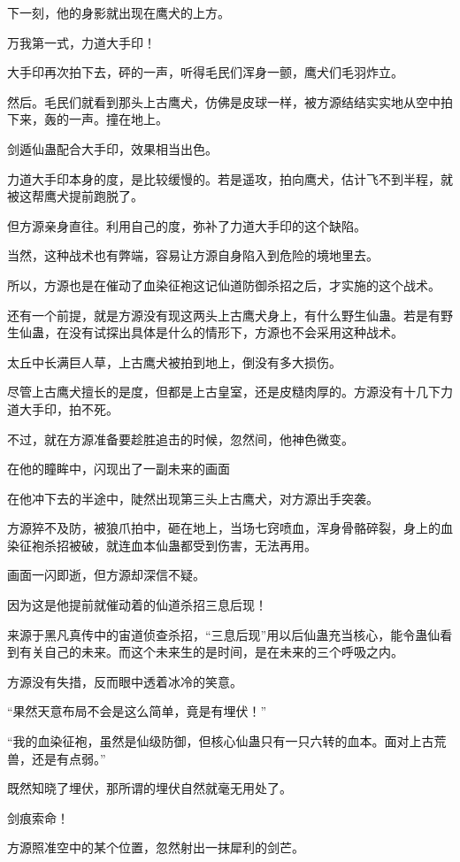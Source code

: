 \begin{this_body}
下一刻，他的身影就出现在鹰犬的上方。

万我第一式，力道大手印！

大手印再次拍下去，砰的一声，听得毛民们浑身一颤，鹰犬们毛羽炸立。

然后。毛民们就看到那头上古鹰犬，仿佛是皮球一样，被方源结结实实地从空中拍下来，轰的一声。撞在地上。

剑遁仙蛊配合大手印，效果相当出色。

力道大手印本身的度，是比较缓慢的。若是遥攻，拍向鹰犬，估计飞不到半程，就被这帮鹰犬提前跑脱了。

但方源亲身直往。利用自己的度，弥补了力道大手印的这个缺陷。

当然，这种战术也有弊端，容易让方源自身陷入到危险的境地里去。

所以，方源也是在催动了血染征袍这记仙道防御杀招之后，才实施的这个战术。

还有一个前提，就是方源没有现这两头上古鹰犬身上，有什么野生仙蛊。若是有野生仙蛊，在没有试探出具体是什么的情形下，方源也不会采用这种战术。

太丘中长满巨人草，上古鹰犬被拍到地上，倒没有多大损伤。

尽管上古鹰犬擅长的是度，但都是上古皇室，还是皮糙肉厚的。方源没有十几下力道大手印，拍不死。

不过，就在方源准备要趁胜追击的时候，忽然间，他神色微变。

在他的瞳眸中，闪现出了一副未来的画面

在他冲下去的半途中，陡然出现第三头上古鹰犬，对方源出手突袭。

方源猝不及防，被狼爪拍中，砸在地上，当场七窍喷血，浑身骨骼碎裂，身上的血染征袍杀招被破，就连血本仙蛊都受到伤害，无法再用。

画面一闪即逝，但方源却深信不疑。

因为这是他提前就催动着的仙道杀招三息后现！

来源于黑凡真传中的宙道侦查杀招，“三息后现”用以后仙蛊充当核心，能令蛊仙看到有关自己的未来。而这个未来生的是时间，是在未来的三个呼吸之内。

方源没有失措，反而眼中透着冰冷的笑意。

“果然天意布局不会是这么简单，竟是有埋伏！”

“我的血染征袍，虽然是仙级防御，但核心仙蛊只有一只六转的血本。面对上古荒兽，还是有点弱。”

既然知晓了埋伏，那所谓的埋伏自然就毫无用处了。

剑痕索命！

方源照准空中的某个位置，忽然射出一抹犀利的剑芒。


\end{this_body}
